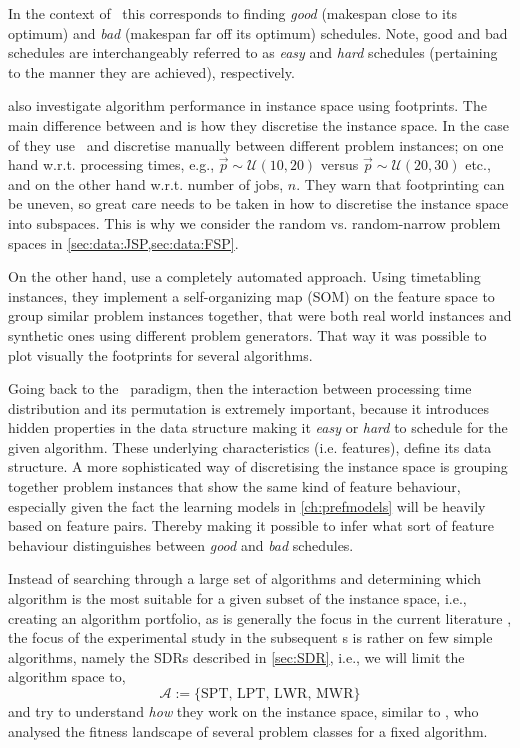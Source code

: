 \clearpage

In the context of \jsp\ this corresponds to finding \emph{good} (makespan close to its optimum)  and \emph{bad} (makespan far off its optimum) schedules. Note, good and bad schedules are interchangeably referred to as \emph{easy} and \emph{hard} schedules (pertaining to the manner they are achieved), respectively. 

\citet{SmithMilesLion5} also investigate algorithm performance in instance space using footprints. The main difference between \citeauthor{Corne10} and \citeauthor{SmithMilesLion5} is how they discretise the instance space. In the case of \citeauthor{Corne10} they use \jsp\ and discretise manually between different problem instances; on one hand w.r.t. processing times, e.g.,  $\vec{p}\sim \mathcal{U}(10,20)$ versus $\vec{p}\sim \mathcal{U}(20,30)$ etc., and on the other hand w.r.t. number of jobs, $n$. 
They warn that footprinting can be uneven, so great care needs to be taken in 
how to discretise the instance space into subspaces. 
This is why we consider the random vs. random-narrow problem spaces in 
\cref{sec:data:JSP,sec:data:FSP}.

On the other hand, \citeauthor{SmithMilesLion5} use a completely automated 
approach. Using timetabling instances, they implement a self-organizing map 
(SOM) on the feature space to group similar problem instances together, that 
were both real world instances and synthetic ones using different problem 
generators. That way it was possible to plot visually the footprints for 
several algorithms.

Going back to the \jsp\ paradigm, then the interaction between processing time 
distribution and its permutation is extremely important, because it introduces 
hidden properties in the data structure making it \emph{easy} or \emph{hard} to 
schedule for the given algorithm. These underlying characteristics (i.e. 
features), define its data structure. A more sophisticated way of discretising 
the instance space is grouping together problem instances that show the same 
kind of feature behaviour, especially given the fact the learning models in 
\cref{ch:prefmodels} will be heavily based on feature pairs. Thereby making it 
possible to infer what sort of feature behaviour distinguishes  between 
\emph{good} and \emph{bad} schedules. 

Instead of searching through a large set of algorithms  and determining which 
algorithm is the most suitable for a given subset of the instance space, i.e., 
creating an algorithm portfolio, as is generally the focus in the current 
literature \citep{SmithMilesLion3,SmithMilesLion5,Corne10}, the focus of the 
experimental study in the subsequent s
is rather on few simple algorithms, namely the SDRs described in 
\cref{sec:SDR}, i.e., we will limit the algorithm space to, 
\begin{equation}\label{eq:SDRset}
\mathcal{A}:=\{\text{SPT,~LPT,~LWR,~MWR}\}
\end{equation} 
and try to understand \emph{how} they work on the instance space, similar to 
\citet{Whitley}, who analysed the fitness landscape of several problem classes 
for a fixed algorithm. 

